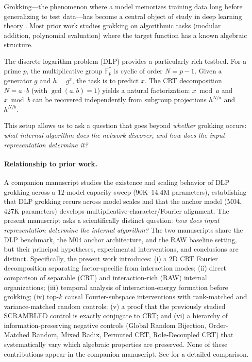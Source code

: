 \documentclass[11pt,a4paper]{article}
\theoremstyle{definition}
\theoremstyle{remark}
\newcommand{\Fp}{\mathbb{F}_p^*}
\begin{document}
Grokking---the phenomenon where a model memorizes training data long before generalizing to test data---has become a central object of study in deep learning theory \citep{power2022grokking, nanda2023progress}. Most prior work studies grokking on algorithmic tasks (modular addition, polynomial evaluation) where the target function has a known algebraic structure.

The discrete logarithm problem (DLP) provides a particularly rich testbed. For a prime $p$, the multiplicative group $\Fp$ is cyclic of order $N = p-1$. Given a generator $g$ and $h = g^x$, the task is to predict $x$. The CRT decomposition $N = a \cdot b$ (with $\gcd(a,b)=1$) yields a natural factorization: $x \bmod a$ and $x \bmod b$ can be recovered independently from subgroup projections $h^{N/a}$ and $h^{N/b}$.

This setup allows us to ask a question that goes beyond \emph{whether} grokking occurs: \emph{what internal algorithm does the network discover, and how does the input representation determine it?}

\paragraph{Relationship to prior work.} A companion manuscript \citep{vesterlund2026grokking} studies the existence and scaling behavior of DLP grokking across a 12-model capacity sweep (90K--14.4M parameters), establishing that DLP grokking recurs across model scales and that the anchor model (M04, 427K parameters) develops multiplicative-character/Fourier alignment. The present manuscript asks a scientifically distinct question: \emph{how does input representation determine the internal algorithm?} The two manuscripts share the DLP benchmark, the M04 anchor architecture, and the RAW baseline setting, but their principal hypotheses, experimental interventions, and conclusions are distinct. Specifically, the present work introduces: (i) a 2D CRT Fourier decomposition separating factor-specific from interaction modes; (ii) direct comparison of separable (CRT) and interaction-rich (RAW) internal organizations; (iii) temporal analysis of interaction-energy formation before grokking; (iv) top-$k$ causal Fourier-subspace interventions with rank-matched and variance-matched random controls; (v) a proof that the previously studied SCRAMBLED control is exactly conjugate to CRT; and (vi) a hierarchy of information-preserving negative controls (Global Random Bijection, Order-Matched Random, Mixed Radix, Permuted CRT, Role-Decoupled CRT) that systematically vary which algebraic properties are preserved. None of these contributions appear in the companion manuscript. See  for a detailed comparison.
\end{document}
